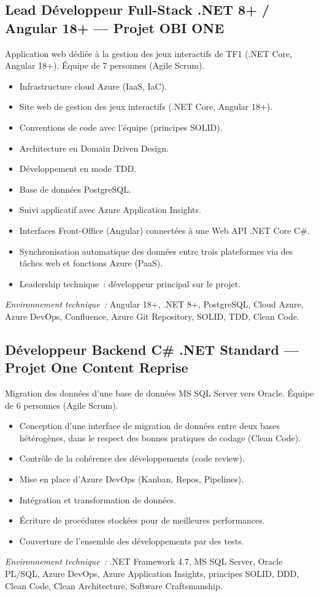 \documentclass[10pt,a4paper]{article}
\begin{document}
\vspace{6pt}

\subsection*{Lead Développeur Full-Stack .NET 8+ / Angular 18+ --- Projet OBI ONE}
\color{darkgray}
Application web dédiée à la gestion des jeux interactifs de TF1 (.NET Core, Angular 18+). Équipe de 7 personnes (Agile Scrum).
\begin{itemize}
  \item Infrastructure cloud Azure (IaaS, IaC).
  \item Site web de gestion des jeux interactifs (.NET Core, Angular 18+).
  \item Conventions de code avec l'équipe (principes SOLID).
  \item Architecture en Domain Driven Design.
  \item Développement en mode TDD.
  \item Base de données PostgreSQL.
  \item Suivi applicatif avec Azure Application Insights.
  \item Interfaces Front-Office (Angular) connectées à une Web API .NET Core C\#.
  \item Synchronisation automatique des données entre trois plateformes via des tâches web et fonctions Azure (PaaS).
  \item Leadership technique~: développeur principal sur le projet.
\end{itemize}
\textit{Environnement technique~:} Angular 18+, .NET 8+, PostgreSQL, Cloud Azure, Azure DevOps, Confluence, Azure Git Repository, SOLID, TDD, Clean Code.

\vspace{6pt}

\subsection*{Développeur Backend C\# .NET Standard --- Projet One Content Reprise}
\color{darkgray}
Migration des données d'une base de données MS SQL Server vers Oracle. Équipe de 6 personnes (Agile Scrum).
\begin{itemize}
  \item Conception d'une interface de migration de données entre deux bases hétérogènes, dans le respect des bonnes pratiques de codage (Clean Code).
  \item Contrôle de la cohérence des développements (code review).
  \item Mise en place d'Azure DevOps (Kanban, Repos, Pipelines).
  \item Intégration et transformation de données.
  \item Écriture de procédures stockées pour de meilleures performances.
  \item Couverture de l'ensemble des développements par des tests.
\end{itemize}
\textit{Environnement technique~:} .NET Framework 4.7, MS SQL Server, Oracle PL/SQL, Azure DevOps, Azure Application Insights, principes SOLID, DDD, Clean Code, Clean Architecture, Software Craftsmanship.
\end{document}
